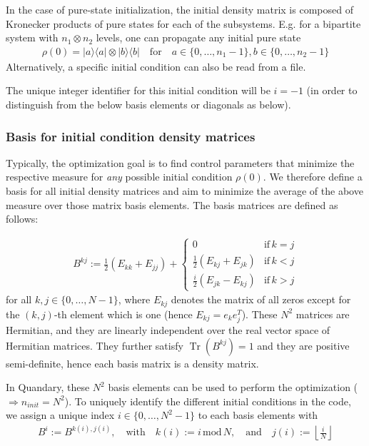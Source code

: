 \documentclass[11pt]{article}
\DeclareMathOperator{\Tr}{Tr}
\begin{document}
In the case of pure-state initialization, the initial density matrix is composed
of Kronecker products of pure states for each of the subsystems. E.g. for a bipartite system with $n_1
\otimes n_2$ levels, one can propagate any initial pure state 
\begin{align}
  \rho(0)  = |a\rangle \langle a| \otimes |b\rangle \langle b| \quad \text{for} \quad a \in \{0,\dots, n_1-1\}, b\in \{0,\dots, n_2-1\}
\end{align}
Alternatively, a specific initial condition can also be read from a file. 

The unique integer identifier for
this initial condition will be $i=-1$ (in order to distinguish from the below
basis elements or diagonals as below). 

\subsubsection{Basis for initial condition density matrices}
Typically, the optimization goal is to find control parameters that minimize the
respective measure for \textit{any} possible initial condition $\rho(0)$. We
therefore define a basis for all initial density matrices and aim to minimize
the average of the above measure over those matrix basis elements. The basis
matrices are defined as follows:

\begin{align}\label{eq:basismats}
B^{kj} := \frac 12 \left( E_{kk} + E_{jj}\right) +  \begin{cases} 
          0 & \text{if} \, k=j \\ 
        \frac 12 \left( E_{kj} + E_{jk}\right) & \text{if} \, k<j \\
        \frac i2 \left( E_{jk} - E_{kj}\right) & \text{if} \, k>j
      \end{cases} 
\end{align}
for all $k,j\in\{0,\dots, N-1\}$, where $E_{kj}$ denotes the matrix of all zeros
except for the $(k,j)$-th element which is one (hence $E_{kj} = e_ke_j^T$).
These $N^2$ matrices are Hermitian, and they are linearly independent over the
real vector space of Hermitian matrices. They further satisfy $\Tr(B^{kj}) = 1$
and they are positive semi-definite, hence each basis matrix is a density
matrix. 

In Quandary, these $N^2$ basis elements can be used to perform the optimization ($\Rightarrow n_{init}=N^2$). To uniquely identify the different initial conditions in the code, we assign a
unique index $i \in \{0,\dots, N^2-1\}$ to each basis elements with 
\begin{align*}
  B^i := B^{k(i), j(i)}, \quad \text{with} \quad k(i) := i \,\mbox{mod}\, N,
  \quad \text{and} \quad j(i) := \left\lfloor \frac{i}{N} \right\rfloor
\end{align*}
\end{document}
